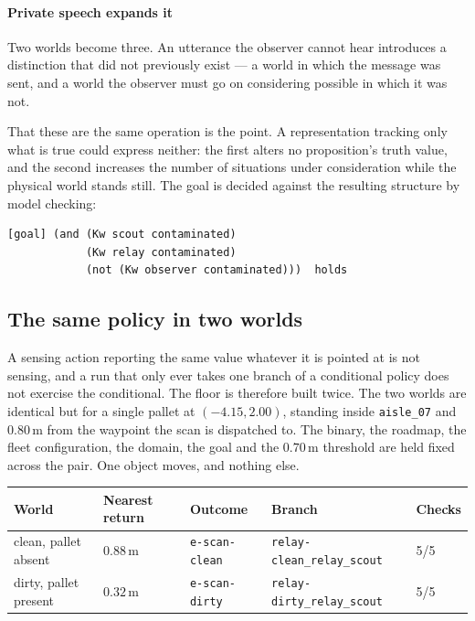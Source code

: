 \documentclass[11pt,a4paper]{article}
\theoremstyle{definition}
\newcommand{\code}[1]{\texttt{\small #1}}
\begin{document}
\paragraph{Private speech expands it} Two worlds become three. An utterance the
observer cannot hear introduces a distinction that did not previously exist ---
a world in which the message was sent, and a world the observer must go on
considering possible in which it was not.

That these are the same operation is the point. A representation tracking only
what is true could express neither: the first alters no proposition's truth
value, and the second increases the number of situations under consideration
while the physical world stands still. The goal is decided against the resulting structure by model checking:

\begin{lstlisting}
[goal] (and (Kw scout contaminated)
            (Kw relay contaminated)
            (not (Kw observer contaminated)))  holds
\end{lstlisting}

\subsection{The same policy in two worlds}
\label{sec:twoworlds}

A sensing action reporting the same value whatever it is pointed at is not
sensing, and a run that only ever takes one branch of a conditional policy does
not exercise the conditional. The floor is therefore built twice. The two worlds
are identical but for a single pallet at $(-4.15, 2.00)$, standing inside
\code{aisle\_07} and $0.80$\,m from the waypoint the scan is dispatched to. The
binary, the roadmap, the fleet configuration, the domain, the goal and the
$0.70$\,m threshold are held fixed across the pair. One object moves, and
nothing else.

\begin{center}
\begin{tabular}{@{}lllll@{}}
\toprule
World & Nearest return & Outcome & Branch & Checks \\
\midrule
clean, pallet absent  & $0.88$\,m & \code{e-scan-clean} & \code{relay-clean\_relay\_scout} & 5/5 \\
dirty, pallet present & $0.32$\,m & \code{e-scan-dirty} & \code{relay-dirty\_relay\_scout} & 5/5 \\
\bottomrule
\end{tabular}
\end{center}
\end{document}
